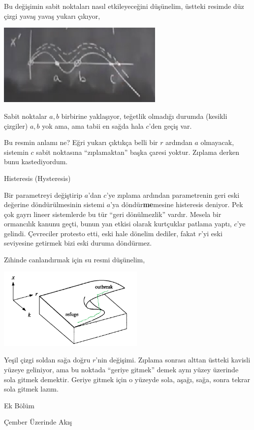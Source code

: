 \documentclass[12pt,fleqn]{article}\usepackage{../../common}
\begin{document}
Bu değişimin sabit noktaları nasıl etkileyeceğini düşünelim, üstteki resimde düz
çizgi yavaş yavaş yukarı çıkıyor,

\includegraphics[height=4cm]{04_12.png}

Sabit noktalar $a,b$ birbirine yaklaşıyor, teğetlik olmadığı durumda (kesikli
çizgiler) $a,b$ yok ama, ama tabii en sağda hala $c$'den geçiş var.

Bu resmin anlamı ne? Eğri yukarı çıktıkça belli bir $r$ ardından $a$ olmayacak,
sistemin $c$ sabit noktasına ``zıplamaktan'' başka çaresi yoktur. Zıplama derken
bunu kastediyordum.

Histeresis (Hysteresis)

Bir parametreyi değiştirip $a$'dan $c$'ye zıplama ardından parametrenin geri
eski değerine döndürülmesinin sistemi $a$'ya döndür\textbf{me}mesine histeresis
deniyor. Pek çok gayrı lineer sistemlerde bu tür ``geri dönülmezlik''
vardır. Mesela bir ormancılık kanunu geçti, bunun yan etkisi olarak kurtçuklar
patlama yaptı, $c$'ye gelindi. Çevreciler protesto etti, eski hale dönelim
dediler, fakat $r$'yi eski seviyesine getirmek bizi eski duruma döndürmez.

Zihinde canlandırmak için su resmi düşünelim,

\includegraphics[height=4cm]{04_13.png}

Yeşil çizgi soldan sağa doğru $r$'nin değişimi. Zıplama sonrası alttan üstteki
kavisli yüzeye geliniyor, ama bu noktada ``geriye gitmek'' demek aynı yüzey
üzerinde sola gitmek demektir. Geriye gitmek için o yüzeyde sola, aşağı, sağa,
sonra tekrar sola gitmek lazım.

Ek Bölüm

Çember Üzerinde Akış
\end{document}

